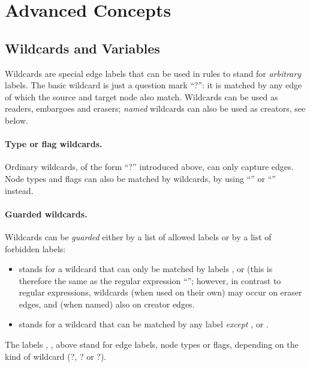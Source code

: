 \section{Advanced Concepts}


\subsection{Wildcards and Variables}

Wildcards are special edge labels that can be used in rules to stand for
\emph{arbitrary} labels. The basic wildcard is just a question mark
``\lab?'': it is matched by any edge of which the source and target node
also match. Wildcards can be used as readers, embargoes and erasers;
\emph{named} wildcards can also be used as creators, see below.

\paragraph{Type or flag wildcards.}

Ordinary wildcards, of the form ``\lab?'' introduced above, can only
capture edges. Node types and flags can also be matched by wildcards, by using
``'' or ``'' instead.

\paragraph{Guarded wildcards.}

Wildcards can be \emph{guarded} either by a list of allowed labels or by a list
of forbidden labels:
\begin{itemize}\noitemsep
\item {} stands for a wildcard that can only be matched by
  labels ,  or  (this is therefore the same as
  the regular expression ``''; however, in contrast to
  regular expressions, wildcards (when used on their own) may occur on eraser
  edges, and (when named) also on creator edges.

\item {} stands for a wildcard that can be matched by any
  label \emph{except} ,  or .
\end{itemize}
%
The labels , ,  above stand for edge labels, node types
or flags, depending on the kind of wildcard (\lab?, \typeP\lab? or
\flagP\lab?).

